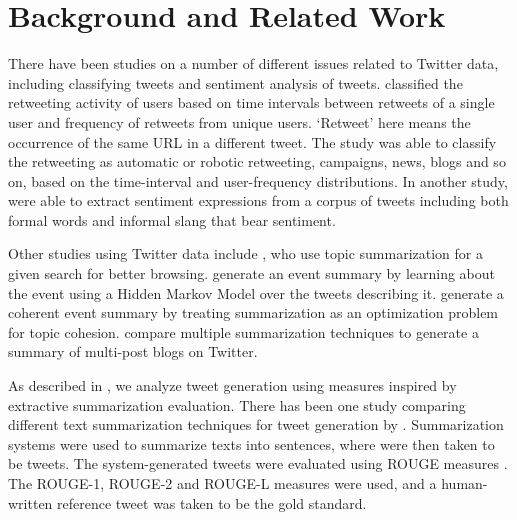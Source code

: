 \section{Background and Related Work}
\label{sec:background}

There have been studies on a number of different issues related to Twitter data, including classifying tweets and sentiment analysis of tweets.  classified the retweeting activity of users based on time intervals between retweets of a single user and frequency of retweets from unique users. `Retweet' here means the occurrence of the same URL in a different tweet. The study was able to classify the retweeting as automatic or robotic retweeting, campaigns, news, blogs and so on, based on the time-interval and user-frequency distributions. In another study,  were able to extract sentiment expressions from a corpus of tweets including both formal words and informal slang that bear sentiment.

Other studies using Twitter data include , who use topic summarization for a given search for better browsing.  generate an event summary by learning about the event using a Hidden Markov Model over the tweets describing it.  generate a coherent event summary by treating summarization as an optimization problem for topic cohesion.  compare multiple summarization techniques to generate a summary of multi-post blogs on Twitter.

As described in , we analyze tweet generation using measures inspired by extractive summarization evaluation. There has been one study comparing different text summarization techniques for tweet generation by . Summarization systems were used to summarize texts into sentences, where were then taken to be tweets. The system-generated tweets were evaluated using ROUGE measures \cite{lin2004rouge}. The ROUGE-1, ROUGE-2 and ROUGE-L measures were used, and a human-written reference tweet was taken to be the gold standard. %

